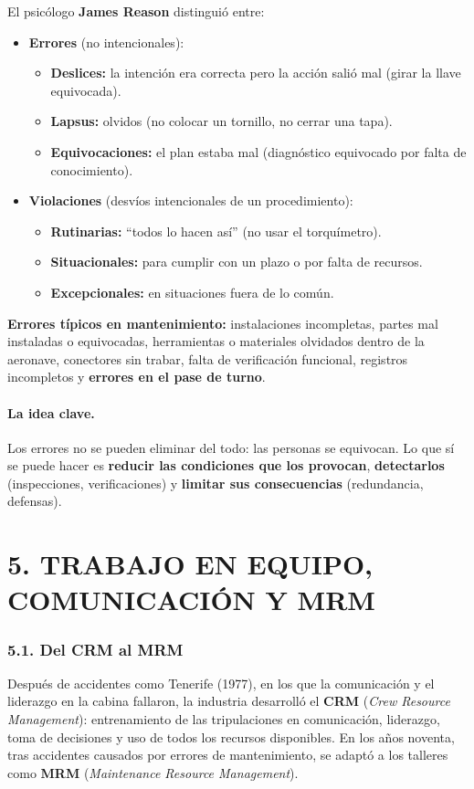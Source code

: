 El psicólogo \textbf{James Reason} distinguió entre:
\begin{itemize}
  \item \textbf{Errores} (no intencionales):
  \begin{itemize}
    \item \textbf{Deslices:} la intención era correcta pero la acción salió mal (girar la llave
          equivocada).
    \item \textbf{Lapsus:} olvidos (no colocar un tornillo, no cerrar una tapa).
    \item \textbf{Equivocaciones:} el plan estaba mal (diagnóstico equivocado por falta de
          conocimiento).
  \end{itemize}
  \item \textbf{Violaciones} (desvíos intencionales de un procedimiento):
  \begin{itemize}
    \item \textbf{Rutinarias:} ``todos lo hacen así'' (no usar el torquímetro).
    \item \textbf{Situacionales:} para cumplir con un plazo o por falta de recursos.
    \item \textbf{Excepcionales:} en situaciones fuera de lo común.
  \end{itemize}
\end{itemize}
\textbf{Errores típicos en mantenimiento:} instalaciones incompletas, partes mal instaladas o
equivocadas, herramientas o materiales olvidados dentro de la aeronave, conectores sin trabar,
falta de verificación funcional, registros incompletos y \textbf{errores en el pase de turno}.

\paragraph*{La idea clave.} Los errores no se pueden eliminar del todo: las personas se equivocan.
Lo que sí se puede hacer es \textbf{reducir las condiciones que los provocan}, \textbf{detectarlos}
(inspecciones, verificaciones) y \textbf{limitar sus consecuencias} (redundancia, defensas).

\section*{5. TRABAJO EN EQUIPO, COMUNICACIÓN Y MRM}

\subsubsection*{5.1. Del CRM al MRM}
Después de accidentes como Tenerife (1977), en los que la comunicación y el liderazgo en la
cabina fallaron, la industria desarrolló el \textbf{CRM} (\textit{Crew Resource Management}):
entrenamiento de las tripulaciones en comunicación, liderazgo, toma de decisiones y uso de todos
los recursos disponibles. En los años noventa, tras accidentes causados por errores de
mantenimiento, se adaptó a los talleres como \textbf{MRM} (\textit{Maintenance Resource
Management}).

